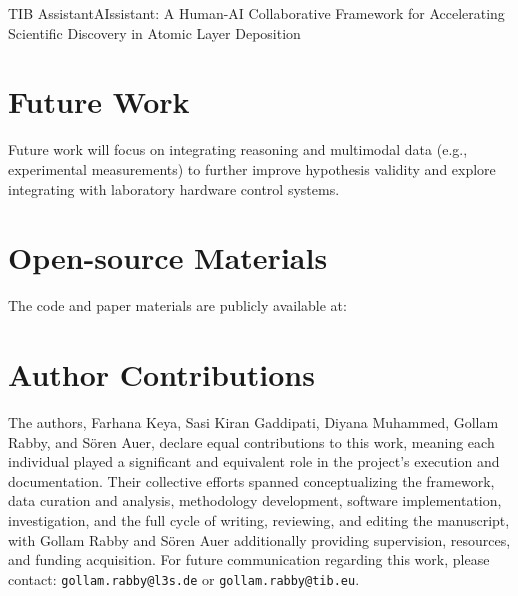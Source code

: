 \begin{teamsubmission}{TIB Assistant}{AIssistant: A Human-AI Collaborative Framework for Accelerating Scientific Discovery in Atomic Layer Deposition}
\section*{Future Work}
Future work will focus on integrating reasoning and multimodal data (e.g., experimental measurements) to further improve hypothesis validity and explore integrating with laboratory hardware control systems.

\section*{Open-source Materials}
The code and paper materials are publicly available at: 

\section*{Author Contributions}
The authors, Farhana Keya, Sasi Kiran Gaddipati, Diyana Muhammed, Gollam Rabby, and Sören Auer, declare equal contributions to this work, meaning each individual played a significant and equivalent role in the project's execution and documentation. Their collective efforts spanned conceptualizing the framework, data curation and analysis, methodology development, software implementation, investigation, and the full cycle of writing, reviewing, and editing the manuscript, with Gollam Rabby and Sören Auer additionally providing supervision, resources, and funding acquisition. For future communication regarding this work, please contact: \texttt{gollam.rabby@l3s.de} or \texttt{gollam.rabby@tib.eu}.

\end{teamsubmission}




